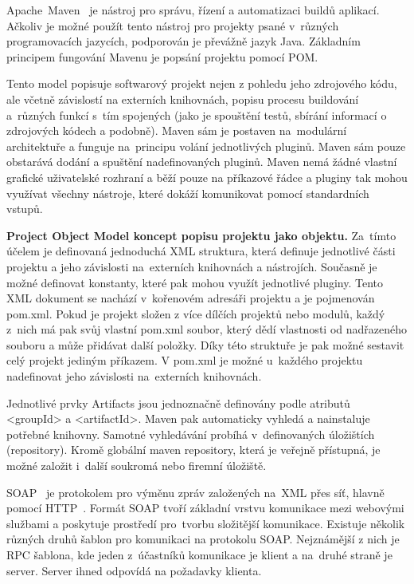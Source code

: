 Apache~Maven~\cite{apache-maven} je nástroj pro správu, řízení a automatizaci buildů aplikací. Ačkoliv je možné použít tento nástroj pro projekty psané v~různých programovacích jazycích, podporován je převážně jazyk Java. Základním principem fungování Mavenu je popsání projektu pomocí POM. 


Tento model popisuje softwarový projekt nejen z pohledu jeho zdrojového kódu, ale včetně závislostí na externích knihovnách, popisu procesu buildování a~různých funkcí s~tím spojených (jako je spouštění testů, sbírání informací o zdrojových kódech a podobně). Maven sám je postaven na~modulární architektuře a funguje na~principu volání jednotlivých pluginů. Maven sám pouze obstarává dodání a spuštění nadefinovaných pluginů. Maven nemá žádné vlastní grafické uživatelské rozhraní a běží pouze na příkazové řádce a pluginy tak mohou využívat všechny nástroje, které dokáží komunikovat pomocí standardních vstupů. 

\textbf{Project Object Model koncept popisu projektu jako objektu.} Za~tímto účelem je definovaná jednoduchá XML struktura, která definuje jednotlivé části projektu a jeho závislosti na~externích knihovnách a nástrojích. Současně je možné definovat konstanty, které pak mohou využít jednotlivé pluginy. Tento XML dokument se nachází v~kořenovém adresáři projektu a je pojmenován pom.xml. Pokud je projekt složen z více dílčích projektů nebo modulů, každý z~nich má pak svůj vlastní pom.xml soubor, který dědí vlastnosti od nadřazeného souboru a může přidávat další položky. Díky této struktuře je pak možné sestavit celý projekt jediným příkazem. V pom.xml je možné u~každého projektu nadefinovat jeho závislosti na~externích knihovnách. 

Jednotlivé prvky Artifacts jsou jednoznačně definovány podle atributů <groupId> a <artifactId>. Maven pak automaticky vyhledá a nainstaluje potřebné knihovny. Samotné vyhledávání probíhá v~definovaných úložištích (repository). Kromě globální maven repository, která je veřejně přístupná, je možné založit i~další soukromá nebo firemní úložiště.

SOAP~\cite{soap} je protokolem pro výměnu zpráv založených na~XML přes síť, hlavně pomocí HTTP~\cite{http}. Formát SOAP tvoří základní vrstvu komunikace mezi webovými službami a poskytuje prostředí pro~tvorbu složitější komunikace. Existuje několik různých druhů šablon pro komunikaci na protokolu SOAP. Nejznámější z nich je RPC šablona, kde jeden z~účastníků komunikace je klient a na~druhé straně je server. Server ihned odpovídá na požadavky klienta.

